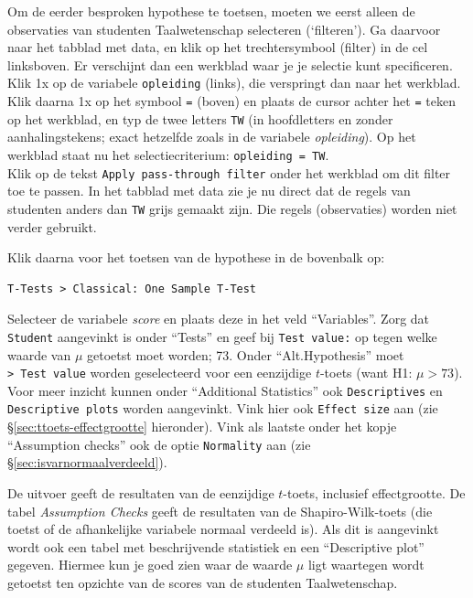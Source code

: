 \documentclass[
]{book}
\begin{document}
Om de eerder besproken hypothese te toetsen, moeten we eerst alleen de observaties van studenten Taalwetenschap selecteren (`filteren'). Ga daarvoor naar het tabblad met data, en klik op het trechtersymbool (filter) in de cel linksboven. Er verschijnt dan een werkblad waar je je selectie kunt specificeren.\\
Klik 1x op de variabele \texttt{opleiding} (links), die verspringt dan naar het werkblad. Klik daarna 1x op het symbool \texttt{=} (boven) en plaats de cursor achter het \texttt{=} teken op het werkblad, en typ de twee letters \texttt{TW} (in hoofdletters en zonder aanhalingstekens; exact hetzelfde zoals in de variabele \emph{opleiding}). Op het werkblad staat nu het selectiecriterium: \texttt{opleiding\ =\ TW}.\\
Klik op de tekst \texttt{Apply\ pass-through\ filter} onder het werkblad om dit filter toe te passen. In het tabblad met data zie je nu direct dat de regels van studenten anders dan \texttt{TW} grijs gemaakt zijn. Die regels (observaties) worden niet verder gebruikt.

Klik daarna voor het toetsen van de hypothese in de bovenbalk op:

\begin{verbatim}
T-Tests > Classical: One Sample T-Test
\end{verbatim}

Selecteer de variabele \emph{score} en plaats deze in het veld ``Variables''. Zorg dat \texttt{Student} aangevinkt is onder ``Tests'' en geef bij \texttt{Test\ value:} op tegen welke waarde van \(\mu\) getoetst moet worden; 73. Onder ``Alt.Hypothesis'' moet \texttt{\textgreater{}\ Test\ value} worden geselecteerd voor een eenzijdige \(t\)-toets (want H1: \(\mu > 73\)). Voor meer inzicht kunnen onder ``Additional Statistics'' ook \texttt{Descriptives} en \texttt{Descriptive\ plots} worden aangevinkt. Vink hier ook \texttt{Effect\ size} aan (zie §\ref{sec:ttoets-effectgrootte} hieronder). Vink als laatste onder het kopje ``Assumption checks'' ook de optie \texttt{Normality} aan (zie §\ref{sec:isvarnormaalverdeeld}).

De uitvoer geeft de resultaten van de eenzijdige \(t\)-toets, inclusief effectgrootte. De tabel \emph{Assumption Checks} geeft de resultaten van de Shapiro-Wilk-toets (die toetst of de afhankelijke variabele normaal verdeeld is). Als dit is aangevinkt wordt ook een tabel met beschrijvende statistiek en een ``Descriptive plot'' gegeven. Hiermee kun je goed zien waar de waarde \(\mu\) ligt waartegen wordt getoetst ten opzichte van de scores van de studenten Taalwetenschap.
\end{document}

